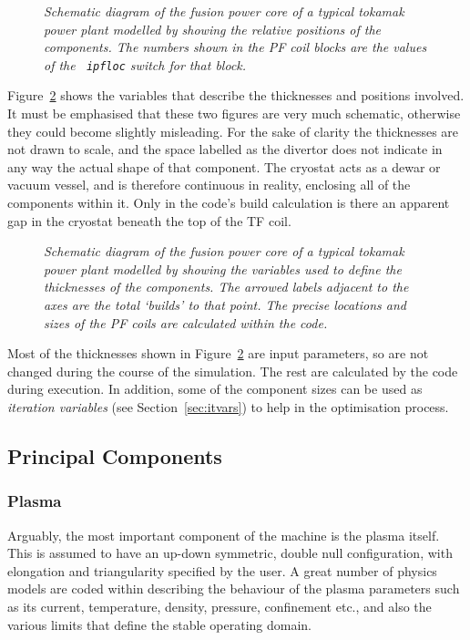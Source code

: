 \begin{figure}
\centerline{}
\vspace{-12mm}
\caption[build1] {\it Schematic diagram of the fusion power core of a typical
tokamak power plant modelled by \PSC showing the relative positions of the
components. The numbers shown in the PF coil blocks are the values of the {\tt
ipfloc} switch for that block.}
\label{fig:build1}
\end{figure}

Figure~\ref{fig:build2} shows the \FORT variables that describe the
thicknesses and positions involved. It must be emphasised that these two
figures are very much schematic, otherwise they could become slightly
misleading. For the sake of clarity the thicknesses are not drawn to scale,
and the space labelled as the divertor does not indicate in any way the actual
shape of that component. The cryostat acts as a dewar or vacuum vessel, and is
therefore continuous in reality, enclosing all of the components within
it. Only in the code's build calculation is there an apparent gap in the
cryostat beneath the top of the TF coil.

\begin{figure}
\centerline{}
\vspace{-12mm}
\caption[build2] {\it Schematic diagram of the fusion power core of a typical
tokamak power plant modelled by \PSC showing the variables used to define the
thicknesses of the components. The arrowed labels adjacent to the axes are the
total `builds' to that point. The precise locations and sizes of the PF coils
are calculated within the code.}
\label{fig:build2}
\end{figure}

Most of the thicknesses shown in Figure~\ref{fig:build2} are input parameters,
so are not changed during the course of the simulation.  The rest are
calculated by the code during execution. In addition, some of the component
sizes can be used as {\it iteration variables}\/ (see
Section~\ref{sec:itvars}) to help in the optimisation process.

\subsection{Principal Components}

\subsubsection{Plasma}
Arguably, the most important component of the machine is the plasma
itself. This is assumed to have an up-down symmetric, double null
configuration, with elongation and triangularity specified by the user. A
great number of physics models are coded within \PS describing the behaviour
of the plasma parameters such as its current, temperature, density, pressure,
confinement etc., and also the various limits that define the stable operating
domain.

